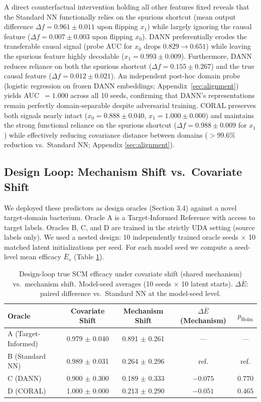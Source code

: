 \documentclass{article}
\begin{document}
A direct counterfactual intervention holding all other features fixed reveals that the Standard NN functionally relies on the spurious shortcut (mean output difference $\Delta f = 0.961 \pm 0.011$ upon flipping $x_1$) while largely ignoring the causal feature ($\Delta f = 0.007 \pm 0.003$ upon flipping $x_0$). DANN preferentially erodes the transferable causal signal (probe AUC for $x_0$ drops $0.829 \to 0.651$) while leaving the spurious feature highly decodable ($x_1 = 0.993 \pm 0.009$). Furthermore, DANN reduces reliance on both the spurious shortcut ($\Delta f = 0.155 \pm 0.267$) and the true causal feature ($\Delta f = 0.012 \pm 0.021$). An independent post-hoc domain probe (logistic regression on frozen DANN embeddings; Appendix~\ref{sec:alignment}) yields AUC~$= 1.000$ across all 10 seeds, confirming that DANN's representations remain perfectly domain-separable despite adversarial training. CORAL preserves both signals nearly intact ($x_0 = 0.888 \pm 0.040$, $x_1 = 1.000 \pm 0.000$) and maintains the strong functional reliance on the spurious shortcut ($\Delta f = 0.988 \pm 0.009$ for $x_1$) while effectively reducing covariance distance between domains ($>$99.6\% reduction vs.\ Standard NN; Appendix \ref{sec:alignment}).

\subsection{Design Loop: Mechanism Shift vs.\ Covariate Shift}
We deployed these predictors as design oracles (Section 3.4) against a novel target-domain bacterium. Oracle A is a Target-Informed Reference with access to target labels. Oracles B, C, and D are trained in the strictly UDA setting (source labels only). We used a nested design: 10 independently trained oracle seeds $\times$ 10 matched latent initializations per seed. For each model seed we compute a seed-level mean efficacy $\bar{E}_s$ (Table \ref{tab:design}).

\begin{table}[H]\footnotesize
\centering
\caption{Design-loop true SCM efficacy under covariate shift (shared mechanism) vs.\ mechanism shift. Model-seed averages (10 seeds $\times$ 10 latent starts). $\Delta \bar{E}$: paired difference vs.\ Standard NN at the model-seed level.}
\label{tab:design}
\begin{tabular}{lcccc}
\toprule
Oracle & Covariate Shift & Mechanism Shift & $\Delta \bar{E}$ (Mechanism) & $p_{\text{Holm}}$ \\
\midrule
A (Target-Informed) & 0.979 $\pm$ 0.040 & 0.891 $\pm$ 0.261 & --- & --- \\
B (Standard NN) & 0.989 $\pm$ 0.031 & 0.264 $\pm$ 0.296 & ref. & ref. \\
C (DANN) & 0.900 $\pm$ 0.300 & 0.189 $\pm$ 0.333 & $-0.075$ & $0.770$ \\
D (CORAL) & 1.000 $\pm$ 0.000 & 0.213 $\pm$ 0.290 & $-0.051$ & $0.465$ \\
\bottomrule
\end{tabular}
\end{table}
\end{document}
